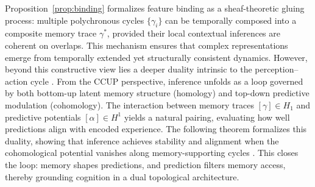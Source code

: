 \documentclass[lettersize,journal]{IEEEtran}
\begin{document}
Proposition~\ref{prop:binding} formalizes feature binding \cite{treisman1996binding} as a sheaf-theoretic gluing process: multiple polychronous cycles \( \{\gamma_i\} \) can be temporally composed into a composite memory trace \( \gamma^* \), provided their local contextual inferences are coherent on overlaps. This mechanism ensures that complex representations emerge from temporally extended yet structurally consistent dynamics. However, beyond this constructive view lies a deeper duality intrinsic to the perception–action cycle \cite{sohn2021network}. From the CCUP perspective, inference unfolds as a loop governed by both bottom-up latent memory structure (homology) and top-down predictive modulation (cohomology). The interaction between memory traces \( [\gamma] \in H_1 \) and predictive potentials \( [\alpha] \in H^1 \) yields a natural pairing, evaluating how well predictions align with encoded experience. The following theorem formalizes this duality, showing that inference achieves stability and alignment when the cohomological potential vanishes along memory-supporting cycles \cite{keller2018predictive}. This closes the loop: memory shapes predictions, and prediction filters memory access, thereby grounding cognition in a dual topological architecture.
\end{document}
